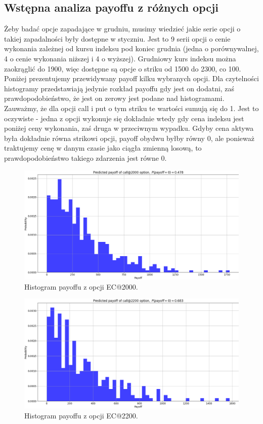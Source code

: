 \documentclass[12pt]{article}
\begin{document}
\subsection{Wstępna analiza payoffu z różnych opcji}
Żeby badać opcje zapadające w grudniu, musimy wiedzieć jakie serie opcji o takiej zapadalności były dostępne w styczniu. Jest to 9 serii opcji o cenie wykonania zależnej od kursu indeksu pod koniec grudnia (jedna o porównywalnej, 4 o cenie wykonania niższej i 4 o wyższej). Grudniowy kurs indeksu można zaokrąglić do 1900, więc dostępne są opcje o striku od 1500 do 2300, co 100.\\
Poniżej prezentujemy przewidywany payoff kilku wybranych opcji. Dla czytelności histogramy przedstawiają jedynie rozkład payoffu gdy jest on dodatni, zaś prawdopodobieństwo, że jest on zerowy jest podane nad histogramami.\\
Zauważmy, że dla opcji call i put o tym striku te wartości sumują się do 1. Jest to oczywiste - jedna z opcji wykonuje się dokładnie wtedy gdy cena indeksu jest poniżej ceny wykonania, zaś druga w przeciwnym wypadku. Gdyby cena aktywa była dokładnie równa strikowi opcji, payoff obydwu byłby równy 0, ale ponieważ traktujemy cenę w danym czasie jako ciągła zmienną losową, to prawdopodobieństwo takiego zdarzenia jest równe 0.
\begin{figure}[htp]
    \centering
    \includegraphics[width=\textwidth,height=\textheight,keepaspectratio]{payoff_call_2000.png}
    \caption{Histogram payoffu z opcji EC@2000.}
    \label{fig:payoff_call2000}
\end{figure}
\begin{figure}[htp]
    \centering
    \includegraphics[width=\textwidth,height=\textheight,keepaspectratio]{payoff_call_2200.png}
    \caption{Histogram payoffu z opcji EC@2200.}
    \label{fig:payoff_call2200}
\end{figure}
\end{document}
